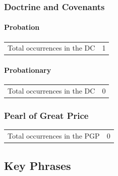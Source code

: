	\subsubsection{Doctrine and Covenants} %
		\label{PROBATION-DC}
		
		\paragraph{Probation}
	
			\begin{tabular}{ll}
				Total occurrences in the DC & 1
			\end{tabular}
			
			\begin{compactdesc}
				\item[{\hyperref[DC29-43]{DC 29:43}}]
			\end{compactdesc}
			
		\paragraph{Probationary}
	
			\begin{tabular}{ll}
				Total occurrences in the DC & 0
			\end{tabular}
			
		
	\subsubsection{Pearl of Great Price} %
		\label{PROBATION-PGP}
	
		\begin{tabular}{ll}
			Total occurrences in the PGP & 0
		\end{tabular}
		
		
\subsection{Key Phrases} %
	\label{PROBATION-PHRASES}


